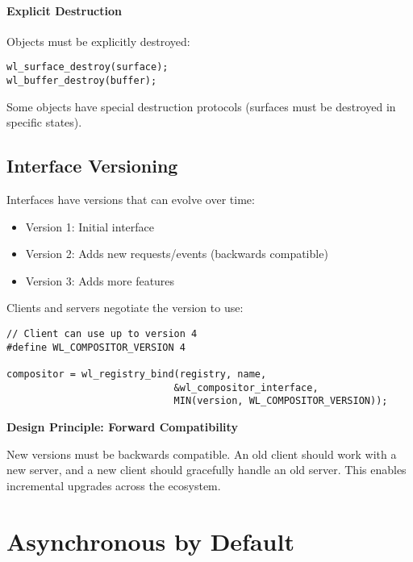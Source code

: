 \paragraph{Explicit Destruction}
Objects must be explicitly destroyed:

\begin{lstlisting}[style=cstyle, caption=Object Destruction]
wl_surface_destroy(surface);
wl_buffer_destroy(buffer);
\end{lstlisting}

Some objects have special destruction protocols (surfaces must be destroyed in specific states).

\subsection{Interface Versioning}

Interfaces have versions that can evolve over time:

\begin{itemize}
    \item Version 1: Initial interface
    \item Version 2: Adds new requests/events (backwards compatible)
    \item Version 3: Adds more features
\end{itemize}

Clients and servers negotiate the version to use:

\begin{lstlisting}[style=cstyle, caption=Version Negotiation]
// Client can use up to version 4
#define WL_COMPOSITOR_VERSION 4

compositor = wl_registry_bind(registry, name,
                             &wl_compositor_interface,
                             MIN(version, WL_COMPOSITOR_VERSION));
\end{lstlisting}

\begin{designbox}
\textbf{Design Principle: Forward Compatibility}

New versions must be backwards compatible. An old client should work with a new server, and a new client should gracefully handle an old server. This enables incremental upgrades across the ecosystem.
\end{designbox}

\section{Asynchronous by Default}

